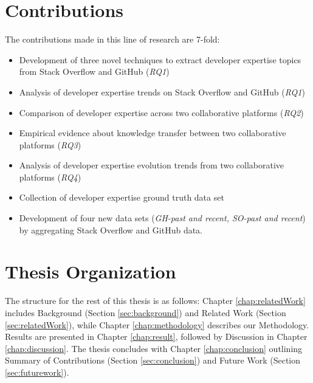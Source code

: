    \section{Contributions\label{sec:contribution}}
        The contributions made in this line of research are 7-fold:
        \begin{itemize}
            \item Development of three novel techniques to extract developer expertise topics from Stack Overflow and GitHub (\emph{RQ1})
            \item Analysis of developer expertise trends on Stack Overflow and GitHub (\emph{RQ1})
            \item Comparison of developer expertise across two collaborative platforms (\emph{RQ2})
            \item Empirical evidence about knowledge transfer between two collaborative platforms (\emph{RQ3})
            \item Analysis of developer expertise evolution trends from two collaborative platforms (\emph{RQ4})
            \item Collection of developer expertise ground truth data set
            \item Development of four new data sets (\emph{GH-past and recent, SO-past and recent}) by aggregating Stack Overflow and GitHub data.
        \end{itemize}
    
     \section{Thesis Organization\label{sec:thesis_structure}}
        The structure for the rest of this thesis is as follows: Chapter \ref{chap:relatedWork} includes Background (Section \ref{sec:background}) and Related Work (Section \ref{sec:relatedWork}), while Chapter \ref{chap:methodology} describes our Methodology. Results are presented in Chapter \ref{chap:result}, followed by Discussion in Chapter \ref{chap:discussion}. The thesis concludes with Chapter \ref{chap:conclusion} outlining Summary of Contributions (Section \ref{sec:conclusion}) and Future Work (Section \ref{sec:futurework}).